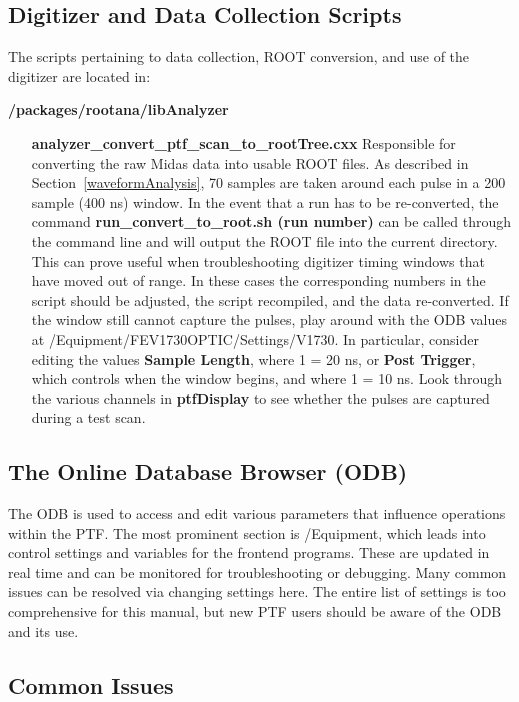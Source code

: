 \documentclass[twoside,letterpaper]{refart}
\begin{document}
\subsection{Digitizer and Data Collection Scripts} \label{dataScripts}

The scripts pertaining to data collection, ROOT conversion, and use of the digitizer are located in:

\textbf{/packages/rootana/libAnalyzer}

\begin{itemize}
	\item [\textbf{analyzer\_convert\_ptf\_scan\_to\_rootTree.cxx}] Responsible for converting the raw Midas data into usable ROOT files. As described in Section~\ref{waveformAnalysis}, 70 samples are taken around each pulse in a 200 sample (400 ns) window. In the event that a run has to be re-converted, the command \textbf{run\_convert\_to\_root.sh (run number)} can be called through the command line and will output the ROOT file into the current directory. This can prove useful when troubleshooting digitizer timing windows that have moved out of range. In these cases the corresponding numbers in the script should be adjusted, the script recompiled, and the data re-converted. If the window still cannot capture the pulses, play around with the ODB values at /Equipment/FEV1730OPTIC/Settings/V1730. In particular, consider editing the values \textbf{Sample Length}, where 1 = 20 ns, or \textbf{Post Trigger}, which controls when the window begins, and where 1 = 10 ns. Look through the various channels in \textbf{ptfDisplay} to see whether the pulses are captured during a test scan.

\end{itemize}

\subsection{The Online Database Browser (ODB)}

The ODB is used to access and edit various parameters that influence operations within the PTF. The most prominent section is /Equipment, which leads into control settings and variables for the frontend programs. These are updated in real time and can be monitored for troubleshooting or debugging. Many common issues can be resolved via changing settings here. The entire list of settings is too comprehensive for this manual, but new PTF users should be aware of the ODB and its use.

\subsection{Common Issues}
\end{document}
